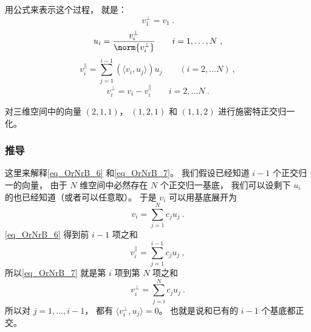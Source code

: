 用公式来表示这个过程， 就是：
\begin{equation}
v_1^\bot = v_1~.
\end{equation}
\begin{equation}
u_i = \frac{v_i^\bot}{\norm{v_i^\bot}} \qquad i = 1, \dots ,N~,
\end{equation}
\begin{equation}\label{eq_OrNrB_6}
v_i^\parallel = \sum _{j=1}^{i-1} (\langle v_i, u_j \rangle) u_j \qquad (i = 2, \dots N)~,
\end{equation}
\begin{equation}\label{eq_OrNrB_7}
v_i^\bot = v_i - v_i^\parallel \qquad i = 2, \dots N~.
\end{equation}

\begin{exercise}{}
对三维空间中的向量 $(2, 1, 1)$， $(1, 2, 1)$ 和 $(1, 1, 2)$ 进行施密特正交归一化。
\end{exercise}

\subsubsection{推导}
这里来解释\autoref{eq_OrNrB_6} 和\autoref{eq_OrNrB_7}。 我们假设已经知道 $i-1$ 个正交归一的向量， 由于 $N$ 维空间中必然存在 $N$ 个正交归一基底， 我们可以设剩下 $u_i$ 的也已经知道（或者可以任意取）。 于是 $v_i$ 可以用基底展开为
\begin{equation}
v_i = \sum _{j=1}^N c_j u_j~.
\end{equation}
\autoref{eq_OrNrB_6} 得到前 $i-1$ 项之和
\begin{equation}
v_i^\parallel = \sum _{j=1}^{i-1} c_ju_j~,
\end{equation}
所以\autoref{eq_OrNrB_7} 就是第 $i$ 项到第 $N$ 项之和
\begin{equation}
v_i^\bot = \sum _{j=i}^{N} c_ju_j~.
\end{equation}
所以对 $j = 1, \dots , i-1$， 都有 $\langle v_i^\bot, u_j \rangle = 0$。 也就是说和已有的 $i-1$ 个基底都正交。